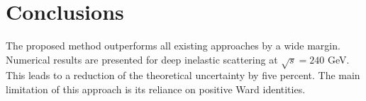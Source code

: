 \section{Conclusions}\label{sec:conclusions}

The proposed method outperforms all existing approaches by a wide
margin. Numerical results are presented for deep inelastic scattering at
$\sqrt{s} = 240$ GeV. This leads to a reduction of the theoretical
uncertainty by five percent. The main limitation of this approach is its
reliance on positive Ward identities.


